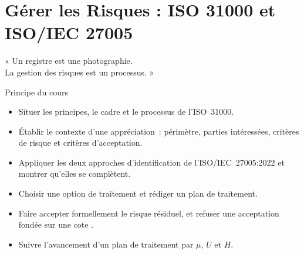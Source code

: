 
\chapter{Gérer les Risques : ISO 31000 et ISO/IEC 27005}
\label{chap:iso27005}

\epigraph{%
    « Un registre est une photographie.\\
    La gestion des risques est un processus. »%
}{Principe du cours}


\begin{boxobjectifs}
\begin{itemize}
    \item Situer les principes, le cadre et le processus de l'ISO~31000.
    \item Établir le contexte d'une appréciation~: périmètre, parties
          intéressées, critères de risque et critères d'acceptation.
    \item Appliquer les deux approches d'identification de
          l'ISO/IEC~27005:2022 et montrer qu'elles se complètent.
    \item Choisir une option de traitement et rédiger un plan de
          traitement.
    \item Faire accepter formellement le risque résiduel, et refuser une
          acceptation fondée sur une cote \NEK{}.
    \item Suivre l'avancement d'un plan de traitement par $\mu$, $U$ et
          $H$.
\end{itemize}
\end{boxobjectifs}

